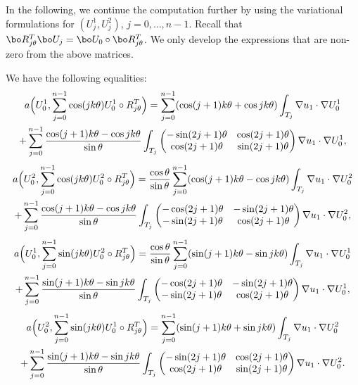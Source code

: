 In the following, we continue the computation further by using the variational formulations for $(U_j^1,U_j^2)$, $j = 0,\dots,n-1$. Recall that $\bo R_{j\theta}^T \bo U_j = \bo U_0 \circ \bo R_{j\theta}^T$. We only develop the expressions that are non-zero from the above matrices.

\begin{propo}\label{prop:detailed-computations}
We have the following equalities:
\vspace*{-5pt}
\begin{multline*}
a\Bigl(U_0^1,\sum_{j=0}^{n-1} \cos(jk\theta) U_0^1 \circ R_{j\theta}^T\Bigr)
= \sum_{j=0}^{n-1} (\cos (j+1)k\theta+\cos jk\theta) \int_{T_j}\nabla u_1 \cdot \nabla U_0^1\\
+ \sum_{j=0}^{n-1} \frac{\cos(j+1)k\theta-\cos jk\theta}{\sin \theta} \int_{T_j}\begin{pmatrix}
-\sin (2j+1)\theta & \cos (2j+1) \theta \\
\cos(2j+1)\theta & \sin (2j+1)\theta
\end{pmatrix}\nabla u_1 \cdot \nabla U_0^1,
\end{multline*}
\vspace*{-5pt}
\begin{multline*}
a\Bigl(U_0^2,\sum_{j=0}^{n-1} \cos(jk\theta) U_0^2 \circ R_{j\theta}^T\Bigr)
=\frac{\cos \theta}{\sin \theta}\sum_{j=0}^{n-1} (\cos(j+1)k\theta-\cos jk\theta) \int_{T_j} \nabla u_1 \cdot \nabla U_0^2\\
+ \sum_{j=0}^{n-1} \frac{\cos(j+1)k\theta-\cos jk\theta}{\sin \theta} \int_{T_j}
\begin{pmatrix}
-\cos(2j+1)\theta & -\sin(2j+1)\theta \\
-\sin(2j+1)\theta & \cos(2j+1)\theta
\end{pmatrix}\nabla u_1 \cdot \nabla U_0^2,
\end{multline*}
\begin{multline*}
a\Bigl(U_0^1,\sum_{j=0}^{n-1} \sin(jk\theta) U_0^2 \circ R_{j\theta}^T\Bigr)
= \frac{\cos \theta}{\sin \theta}\sum_{j=0}^{n-1} (\sin(j+1)k\theta-\sin jk\theta) \int_{T_j} \nabla u_1\cdot \nabla U_0^1\\
+ \sum_{j=0}^{n-1}\dfrac{\sin(j+1)k\theta-\sin jk\theta}{\sin \theta} \int _{T_j} \begin{pmatrix}
-\cos (2j+1)\theta & -\sin (2j+1) \theta \\
-\sin (2j+1)\theta & \cos (2j+1)\theta
\end{pmatrix}\nabla u_1 \cdot \nabla U_0^1,
\end{multline*}
\begin{multline*}
a\Bigl(U_0^2,\sum_{j=0}^{n-1} \sin(jk\theta) U_0^1 \circ R_{j\theta}^T\Bigr) = \sum_{j=0}^{n-1}(\sin (j+1)k\theta + \sin jk\theta) \int_{T_j} \nabla u_1 \cdot \nabla U_0^2 \\
+ \sum_{j=0}^{n-1}\dfrac{\sin(j+1)k\theta-\sin jk\theta}{\sin \theta} \int _{T_j} \begin{pmatrix}
-\sin (2j+1)\theta & \cos (2j+1) \theta \\
\cos (2j+1)\theta & \sin (2j+1)\theta
\end{pmatrix}\nabla u_1 \cdot \nabla U_0^2.
\end{multline*}
\end{propo}

